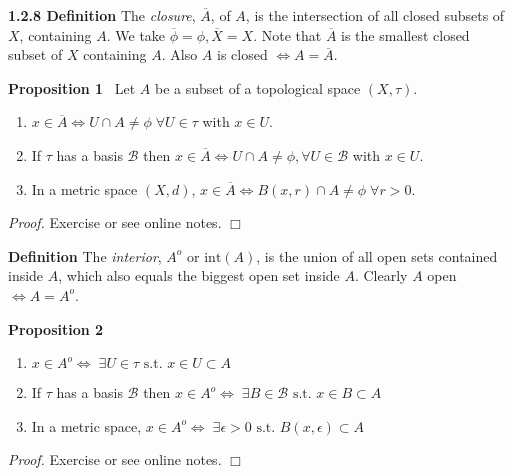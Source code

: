 \documentclass[12pt]{article}
\newcommand{\st}[0]{ \textrm{ s.t. } }
\newcommand{\lrimply}[0] { \Leftrightarrow }
\newcommand{\eps}[0] {  \epsilon }
\newcommand{\B}[0] { \mathcal{B} }
\begin{document}
\begin{flushleft} 
 { \bf 1.2.8 Definition }The \emph{closure}, $\overline{A}$, of $A$, is the intersection of all closed subsets of $X$, containing $A$.
   We take  $\overline{\phi} = \phi, \overline{X} = X$.
     Note that
 $\overline{A}$ is the smallest closed subset of $X$ containing $A$. 
Also $A$ is closed $\lrimply A = \overline{A}$.\end{flushleft}\begin{flushleft} 
 { \bf Proposition 1 } \ Let $A$ be a subset of a topological space $(X,\tau)$.
\begin{enumerate}
\item
                $x \in \overline{A} \lrimply U \cap A \neq \phi \; 
\forall  U \in \tau$ with $x \in U$.
            \item
                If $\tau$ has a basis $\B$ then $x \in \overline{A} 
\lrimply U \cap A \not = \phi, \forall U \in \B$ with $x \in U$.
            \item
                In a metric space $(X, d)$, $x \in \overline{A} \lrimply B(x, r) \cap A \not = \phi \; \forall r>0$.
            \end{enumerate}\begin{flushleft} 
 \emph{Proof.  }  Exercise or see online notes.   $\Box$ 
\end{flushleft}\end{flushleft}\begin{flushleft} 
 { \bf Definition }The \emph{interior}, $A^o$ or $\textrm{int}(A)$,
 is the union of all 
open sets contained inside $A$, which also equals the biggest open set inside $A$. Clearly $A$ open $\lrimply A = A^o$.\end{flushleft}\begin{flushleft} 
 { \bf Proposition 2 } \ \begin{enumerate}
\item
                $x \in A^o \lrimply \; \exists U \in \tau \st x \in U \subset A$
            \item
                If $\tau$ has a basis $\B$ then $x \in A^o \lrimply  \; \exists 
B \in \B \st x \in B \subset A$
            \item
                In a metric space, $x \in A^o \lrimply \; \exists \eps > 0 \st B(x, \eps) \subset A$
            \end{enumerate}\begin{flushleft} 
 \emph{Proof.  }Exercise or see online notes. $\Box$ \end{flushleft}\end{flushleft}\begin{flushleft} 

\end{flushleft}
\end{document}
